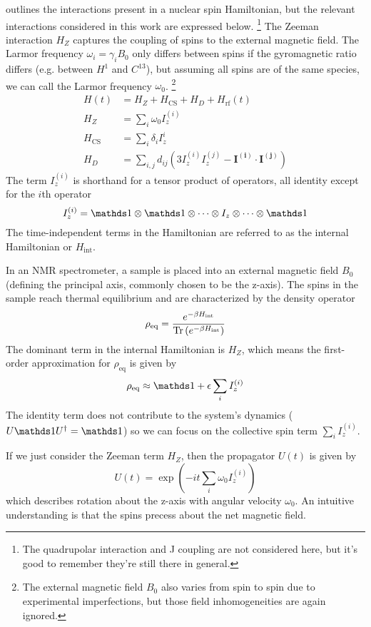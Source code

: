\cite{1976ii} outlines the interactions present in a nuclear spin Hamiltonian, but the relevant interactions considered in this work are expressed below.%
\footnote{The quadrupolar interaction and J coupling are not considered here, but it's good to remember they're still there in general.}
The Zeeman interaction $H_Z$ captures the coupling of spins to the external magnetic field. The Larmor frequency $\omega_i = \gamma_i B_0$ only differs between spins if the gyromagnetic ratio differs (e.g. between $H^1$ and $C^{13}$), but assuming all spins are of the same species, we can call the Larmor frequency $\omega_0$.%
\footnote{The external magnetic field $B_0$ also varies from spin to spin due to experimental imperfections, but those field inhomogeneities are again ignored.}
\begin{align}\label{eq:nmr-ham}
    H(t) &= H_Z + H_\text{CS} + H_D + H_\text{rf}(t) \\
    H_Z &= \sum_i \omega_0 I_z^{(i)} \\
    H_\text{CS} &= \sum_i \delta_i I_z^i \\
    H_D &= \sum_{i,j} d_{ij} \left( 3I_z^{(i)}I_z^{(j)} - \mathbf{I^{(i)}} \cdot \mathbf{I^{(j)}} \right)
\end{align}
The term $I_z^{(i)}$ is shorthand for a tensor product of operators, all identity except for the $i$th operator
\[
I_z^{(i)} = \identity \otimes \identity \otimes \dots \otimes I_z \otimes \dots \otimes \identity
\]
The time-independent terms in the Hamiltonian are referred to as the internal Hamiltonian or $H_{\text{int}}$.


In an NMR spectrometer, a sample is placed into an external magnetic field $B_0$ (defining the principal axis, commonly chosen to be the z-axis). The spins in the sample reach thermal equilibrium and are characterized by the density operator
\[
\rho_{\text{eq}} = \frac{
    e^{-\beta H_{\text{int}}}
    }{
    \text{Tr}\left( 
        e^{-\beta H_{\text{int}}}
      \right)
    }
\]
The dominant term in the internal Hamiltonian is $H_Z$, which means the first-order approximation for $\rho_{\text{eq}}$ is given by
\[
\rho_{\text{eq}} \approx \identity + \epsilon \sum_i I_z^{(i)}
\]
The identity term does not contribute to the system's dynamics ($U \identity U^\dagger = \identity$) so we can focus on the collective spin term $\sum_i I_z^{(i)}$.

If we just consider the Zeeman term $H_Z$, then the propagator $U(t)$ is given by
\[
U(t) = \exp \left( -it \sum_i \omega_0 I_z^{(i)} \right)
\]
which describes rotation about the z-axis with angular velocity $\omega_0$. An intuitive understanding is that the spins precess about the net magnetic field.


